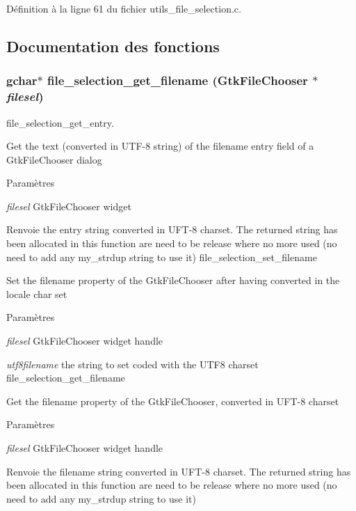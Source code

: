 Définition à la ligne 61 du fichier utils\_\-file\_\-selection.c.



\subsection{Documentation des fonctions}
\subsubsection[{file\_\-selection\_\-get\_\-filename}]{\setlength{\rightskip}{0pt plus 5cm}gchar$\ast$ file\_\-selection\_\-get\_\-filename (GtkFileChooser $\ast$ {\em filesel})}\label{utils__file__selection_8c_a553733327d0e98dc761f3eec04c9d3d3}
file\_\-selection\_\-get\_\-entry.

Get the text (converted in UTF-\/8 string) of the filename entry field of a GtkFileChooser dialog


\begin{DoxyParams}{Paramètres}
\item[{\em filesel}]GtkFileChooser widget\end{DoxyParams}
\begin{DoxyReturn}{Renvoie}
the entry string converted in UFT-\/8 charset. The returned string has been allocated in this function are need to be release where no more used (no need to add any my\_\-strdup string to use it) file\_\-selection\_\-set\_\-filename
\end{DoxyReturn}
Set the filename property of the GtkFileChooser after having converted in the locale char set


\begin{DoxyParams}{Paramètres}
\item[{\em filesel}]GtkFileChooser widget handle \item[{\em utf8filename}]the string to set coded with the UTF8 charset file\_\-selection\_\-get\_\-filename\end{DoxyParams}
Get the filename property of the GtkFileChooser, converted in UFT-\/8 charset


\begin{DoxyParams}{Paramètres}
\item[{\em filesel}]GtkFileChooser widget handle \end{DoxyParams}
\begin{DoxyReturn}{Renvoie}
the filename string converted in UFT-\/8 charset. The returned string has been allocated in this function are need to be release where no more used (no need to add any my\_\-strdup string to use it) 
\end{DoxyReturn}


